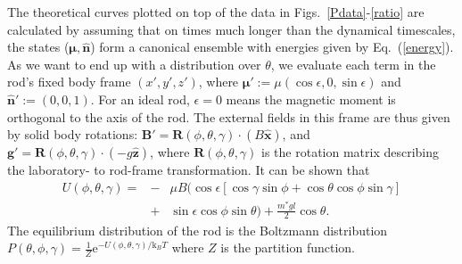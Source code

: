 \documentclass[aps,prl,reprint,twocolumn,superscriptaddress,showpacs]{revtex4-1}
\newcommand{\vcrm}[1]{\mathbf{#1}}
\newcommand{\hvcrm}[1]{\mathbf{\hat{#1}}}
\newcommand{\vc}[1]{\boldsymbol{#1}}
\newcommand{\ssc}[0]{\sin{\gamma}}
\newcommand{\ccc}[0]{\cos{\gamma}}
\newcommand{\cct}[0]{\cos{\theta}}
\newcommand{\ssp}[0]{\sin{\phi}}
\newcommand{\ccp}[0]{\cos{\phi}}
\newcommand{\ee}{\mathrm{e}}
\newcommand{\kk}{\mathrm{k}_B}
\begin{document}
The theoretical curves plotted on top of the data in Figs.\ \ref{Pdata}-\ref{ratio} are calculated by assuming that on times much longer than the dynamical timescales, the states ($\vc{\mu},\hvcrm{n}$) form a canonical ensemble with energies given by Eq.\ (\ref{energy}). As we want to end up with a distribution over $\theta$, we evaluate each term in the rod's fixed body frame $(x',y',z')$, where $\vc{\mu}' :=\mu(\cos\epsilon,0,\sin\epsilon)$ and $\hvcrm{n}' :=(0,0,1)$. For an ideal rod, $\epsilon=0$ means the magnetic moment is orthogonal to the axis of the rod. The external fields in this frame are thus given by solid body rotations: $\vcrm{B}' = \vcrm{R}(\phi,\theta,\gamma)\cdot ( B \hvcrm{x})$, and $\vcrm{g}'= \vcrm{R}(\phi,\theta,\gamma)\cdot ( -g \hvcrm{z})$, where $\vcrm{R}(\phi,\theta,\gamma)$ is the rotation matrix describing the laboratory- to rod-frame transformation. It can be shown that\begin{eqnarray}
U(\phi,\theta,\gamma)  = & - & \mu B \Big( \cos\epsilon [\ccc\ssp + \cct\ccp\ssc] \nonumber \\
& + & \sin\epsilon \cos\phi\sin\theta \Big) + \frac{m^*gl}{2} \cct.
\end{eqnarray}
The equilibrium distribution of the rod is the Boltzmann distribution $P(\theta, \phi, \gamma)  =  \frac{1}{Z} \ee^{ -U(\phi, \theta, \gamma)/\kk T }$ where $Z$ is the partition function.
\end{document}

